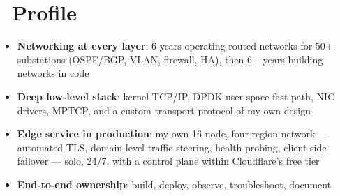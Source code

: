 \documentclass{resume}
\begin{document}



\section{\faRocket\ Profile}
\begin{itemize}[parsep=0.5ex]
    \item \textbf{Networking at every layer}: 6 years operating routed networks for 50+ substations (OSPF/BGP, VLAN, firewall, HA), then 6+ years building networks in code
    \item \textbf{Deep low-level stack}: kernel TCP/IP, DPDK user-space fast path, NIC drivers, MPTCP, and a custom transport protocol of my own design
    \item \textbf{Edge service in production}: my own 16-node, four-region network --- automated TLS, domain-level traffic steering, health probing, client-side failover --- solo, 24/7, with a control plane within Cloudflare's free tier
    \item \textbf{End-to-end ownership}: build, deploy, observe, troubleshoot, document
\end{itemize}
\end{document}

